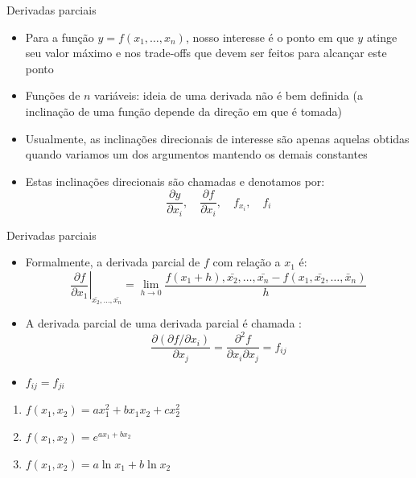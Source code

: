 \documentclass[10pt]{beamer}
\begin{document}
\begin{frame}
    {Derivadas parciais}
    \begin{itemize}
        \item Para a função $y = f(x_1, \dots, x_n)$, nosso interesse é o ponto em que $y$ atinge seu valor máximo e nos trade-offs que devem ser feitos para alcançar este ponto\bigskip
        \item Funções de $n$ variáveis: ideia de uma derivada não é bem definida (a inclinação de uma função depende da direção em que é tomada)\bigskip
        \item Usualmente, as inclinações direcionais de interesse são apenas aquelas obtidas quando variamos um dos argumentos mantendo os demais constantes\bigskip
        \item Estas inclinações direcionais são chamadas  e denotamos por:
        \[
          \frac{\partial y}{\partial x_i}, \quad \frac{\partial f}{\partial x_i}, \quad f_{x_i}, \quad f_i  
        \]
    \end{itemize}
\end{frame}

\begin{frame}
    {Derivadas parciais}
    \begin{itemize}
        \item Formalmente, a derivada parcial de $f$ com relação a $x_1$ é:
        \[
          \left.\frac{\partial f}{\partial x_1}\right|_{\bar{x_2},\dots,\bar{x_n}} = \lim_{h\to 0}\frac{f(x_1 + h), \bar{x_2}, \dots, \bar{x_n} - f(x_1, \bar{x_2},\dots,\bar{x}_n)}{h}
        \]
        \item A derivada parcial de uma derivada parcial é chamada :
        \[
          \frac{\partial (\partial f/\partial x_i)}{\partial x_j} = \frac{\partial^2 f}{\partial x_i\partial x_j} = f_{ij}  
        \]
        \item {} $f_{ij} = f_{ji}$
    \end{itemize}
    \begin{enumerate}
        \item $f(x_1, x_2) = ax_1^2 + bx_1x_2 + cx_2^2$\medskip
        \item $f(x_1, x_2) = e^{ax_1 + bx_2}$\medskip
        \item $f(x_1, x_2) = a\ln x_1 + b\ln x_2$\medskip
    \end{enumerate}
\end{frame}
\end{document}

